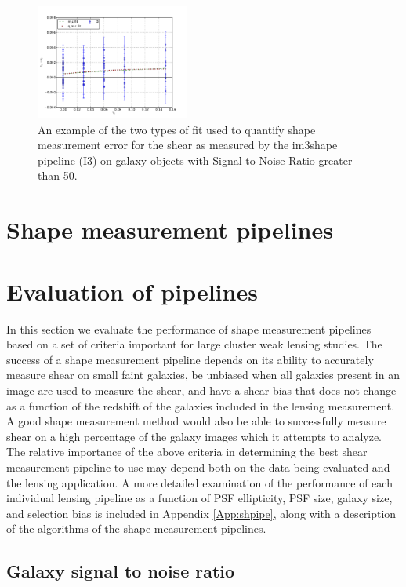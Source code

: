 \documentclass[useAMS,usenatbib]{mn2e}
\begin{document}
\begin{figure}
 \centering  %
  \includegraphics[width=0.45\textwidth]{fig/fitplt.pdf} 
  \caption{An example of the two types of fit used to quantify shape
    measurement error for the shear as measured by the im3shape
    pipeline (I3) on galaxy objects with Signal
    to Noise Ratio greater than 50. }
\label{fig:eqfit}
\end{figure}


\section{Shape measurement pipelines}



\section{Evaluation of pipelines}
In this section we evaluate the performance of shape measurement 
pipelines based on a set of criteria important for large cluster weak
lensing studies. The success of a shape measurement pipeline depends
on its ability to accurately measure shear on small faint galaxies, be unbiased
when all galaxies present in an image are used to measure the shear, and
have a shear bias that does not change as a function of the redshift
of the galaxies included in the lensing measurement. A good shape
measurement method would also be able to successfully measure shear on
a high percentage of the galaxy images which it attempts to analyze. 
The relative importance of the above criteria in determining
the best shear measurement pipeline to use may depend both on the 
data being evaluated and the lensing application. A more detailed examination
of the performance of each individual lensing pipeline 
as a function of PSF ellipticity, PSF size, galaxy size, 
and selection bias is included in Appendix \ref{App:shpipe}, along
with a description of the algorithms of the shape measurement pipelines. \\

\subsection{Galaxy signal to noise ratio}\label{sec:SNR}

\end{document}
